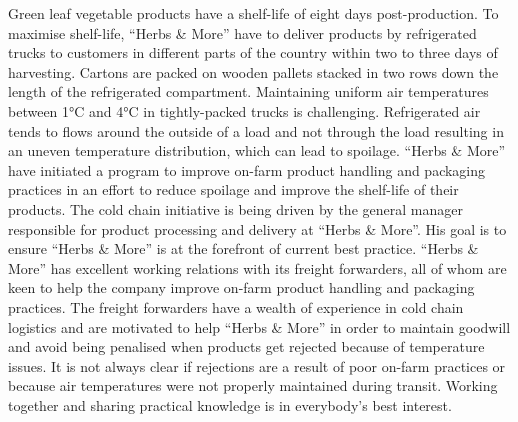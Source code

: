 Green leaf vegetable products have a shelf-life of eight days post-production. To maximise shelf-life, \enquote{Herbs \& More} have to deliver products by refrigerated trucks to customers in different parts of the country within two to three days of harvesting. Cartons are packed on wooden pallets stacked in two rows down the length of the refrigerated compartment. Maintaining uniform air temperatures between 1\si{\degree}C and 4\si{\degree}C in tightly-packed trucks is challenging. Refrigerated air tends to flows around the outside of a load and not through the load resulting in an uneven temperature distribution, which can lead to spoilage. \enquote{Herbs \& More} have initiated a program to improve on-farm product handling and packaging practices in an effort to reduce spoilage and improve the shelf-life of their products. The cold chain initiative is being driven by the general manager responsible for product processing and delivery at \enquote{Herbs \& More}. His goal is to ensure \enquote{Herbs \& More} is at the forefront of current best practice. \enquote{Herbs \& More} has excellent working relations with its freight forwarders, all of whom are keen to help the company improve on-farm product handling and packaging practices. The freight forwarders have a wealth of experience in cold chain logistics and are motivated to help \enquote{Herbs \& More} in order to maintain goodwill and avoid being penalised when products get rejected because of temperature issues. It is not always clear if rejections are a result of poor on-farm practices or because air temperatures were not properly maintained during transit. Working together and sharing practical knowledge is in everybody's best interest.\medskip

